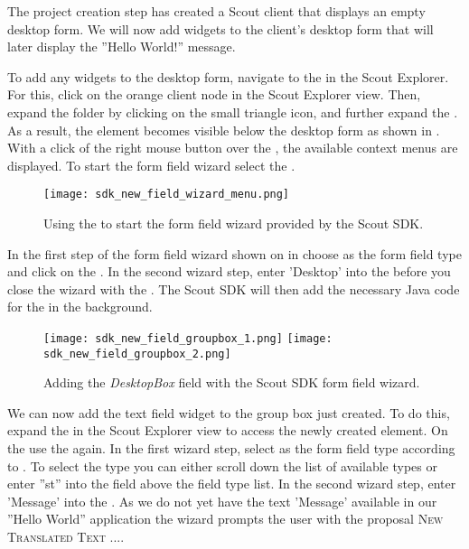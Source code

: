 %

The project creation step has created a Scout client that displays an empty desktop form.
We will now add widgets to the client's desktop form that will later display the ''Hello World!'' message.

To add any widgets to the desktop form, navigate to the  in the Scout Explorer.
For this, click on the orange client node in the Scout Explorer view.
Then, expand the  folder by clicking on the small triangle icon, and further expand the . 
As a result, the  element becomes visible below the desktop form as shown in . 
With a click of the right mouse button over the , the available context menus are displayed.
To start the form field wizard select the .

\begin{figure}
\texttt{[image: sdk\_new\_field\_wizard\_menu.png]} 
\caption{Using the  to start the form field wizard provided by the Scout SDK.}
\end{figure}

In the first step of the form field wizard shown on in  choose  as the form field type and click on the .
In the second wizard step, enter 'Desktop' into the  before you close the wizard with the .
The Scout SDK will then add the necessary Java code for the  in the background.

\begin{figure}
\texttt{[image: sdk\_new\_field\_groupbox\_1.png]} \hspace{8mm}
\texttt{[image: sdk\_new\_field\_groupbox\_2.png]}
\caption{Adding the \textit{DesktopBox} field with the Scout SDK form field wizard.}
\end{figure}

We can now add the text field widget to the group box just created.
To do this, expand the  in the Scout Explorer view to access the newly created  element. 
On the  use the  again.
In the first wizard step, select  as the form field type according to . 
To select the  type you can either scroll down the list of available types or enter ''st'' into the field above the field type list. 
In the second wizard step, enter 'Message' into the .
As we do not yet have the text 'Message' available in our ''Hello World'' application the wizard prompts the user with the proposal \textsc{New Translated Text ...}.

